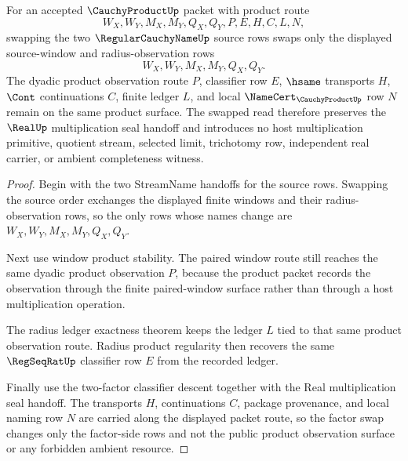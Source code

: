 \begin{theorem}
\label{thm:cauchy-product-factor-swap-observation-surface}
For an accepted $\CauchyProductUp$ packet with product route
$$
W_X,W_Y,M_X,M_Y,Q_X,Q_Y,P,E,H,C,L,N,
$$
swapping the two $\RegularCauchyNameUp$ source rows swaps only the displayed source-window and radius-observation rows
$$
W_X,W_Y,M_X,M_Y,Q_X,Q_Y.
$$
The dyadic product observation route $P$, classifier row $E$, $\hsame$ transports $H$, $\Cont$ continuations $C$, finite ledger $L$, and local $\NameCert_{\CauchyProductUp}$ row $N$ remain on the same product surface. The swapped read therefore preserves the $\RealUp$ multiplication seal handoff and introduces no host multiplication primitive, quotient stream, selected limit, trichotomy row, independent real carrier, or ambient completeness witness.
\end{theorem}
\begin{proof}
Begin with the two StreamName handoffs for the source rows. Swapping the source order exchanges the displayed finite windows and their radius-observation rows, so the only rows whose names change are $W_X,W_Y,M_X,M_Y,Q_X,Q_Y$.

Next use window product stability. The paired window route still reaches the same dyadic product observation $P$, because the product packet records the observation through the finite paired-window surface rather than through a host multiplication operation.

The radius ledger exactness theorem keeps the ledger $L$ tied to that same product observation route. Radius product regularity then recovers the same $\RegSeqRatUp$ classifier row $E$ from the recorded ledger.

Finally use the two-factor classifier descent together with the Real multiplication seal handoff. The transports $H$, continuations $C$, package provenance, and local naming row $N$ are carried along the displayed packet route, so the factor swap changes only the factor-side rows and not the public product observation surface or any forbidden ambient resource.
\end{proof}

